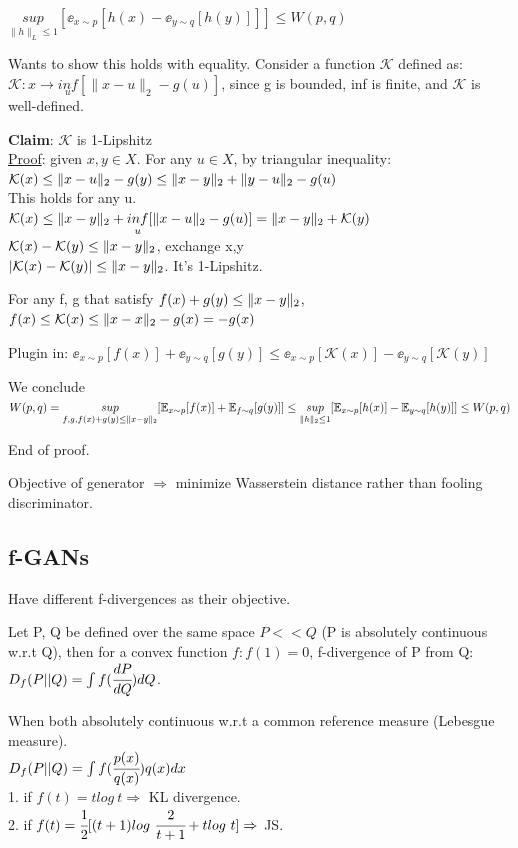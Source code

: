 \documentclass[12pt,a4paper]{article}
\begin{document}
$\underset{\|h\|_L\le 1}{sup}[\ee_{x\sim p}[h(x)-\ee_{y\sim q}[h(y)]]]\le W(p, q)$

Wants to show this holds with equality. 
Consider a function $\mathcal{K}$ defined as:\\
$\mathcal{K}: x\rightarrow \underset{u}{inf}[\|x-u\|_2-g(u)]$, since g is bounded, inf is finite, and $\mathcal{K}$ is well-defined.

\textbf{Claim}: $\mathcal{K}$ is 1-Lipshitz\\
\underline{Proof}: given $x,y\in X$. For any $u\in X$, by triangular inequality:\\
$\mathcal{K}(x)\le \|x-u\|_2-g(y)\le \|x-y\|_2+\|y-u\|_2-g(u)$\\
This holds for any u.\\ 
$\mathcal{K}(x)\le \|x-y\|_2+\underset{u}{inf} [\|x-u\|_2-g(u)]=\|x-y\|_2+\mathcal{K}(y)$\\
$\mathcal{K}(x)-\mathcal{K}(y)\le \|x-y\|_2$, exchange x,y\\
$|\mathcal{K}(x)-\mathcal{K}(y)|\le \|x-y\|_2$. It's 1-Lipshitz. 

For any f, g that satisfy $f(x)+g(y)\le\|x-y\|_2$,\\ 
$f(x)\le \mathcal{K}(x)\le \|x-x\|_2-g(x)=-g(x)$

Plugin in: $\ee_{x\sim p}[f(x)] +\ee_{y\sim q}[g(y)] \le \ee_{x\sim p}[\mathcal{K}(x)]-\ee_{y\sim q}[\mathcal{K}(y)]$

We conclude\\
$W(p,q)=\underset{f,g,f(x)+g(y)\le \|x-y\|_2}{sup}[\mathbb{E}_{x\sim p}[f(x)]+\mathbb{E}_{f\sim q}[g(y)]]
\le \underset{\|h\|_2\le 1}{sup}[\mathbb{E}_{x\sim p}[h(x)]-\mathbb{E}_{y\sim q}[h(y)]]\le W(p,q)$

End of proof. 

Objective of generator $\Rightarrow$ minimize Wasserstein distance rather than fooling discriminator. 

\subsection{f-GANs}
Have different f-divergences as their objective. 

Let P, Q be defined over the same space $P<<Q$ (P is absolutely continuous w.r.t Q), then for a convex function $f: f(1)=0$, f-divergence of P from Q:\\
$D_f(P||Q)=\int f(\cfrac{dP}{dQ})dQ$. 

When both absolutely continuous w.r.t a common reference measure (Lebesgue measure).\\
$D_f(P||Q)=\int f(\cfrac{p(x)}{q(x)})q(x)dx$ \\
1. if $f(t)=tlog\ t\Rightarrow$ KL divergence.\\
2. if $f(t)=\cfrac{1}{2} [(t+1)log\ \cfrac{2}{t+1}+tlog\ t]\Rightarrow$ JS. 
\end{document}
